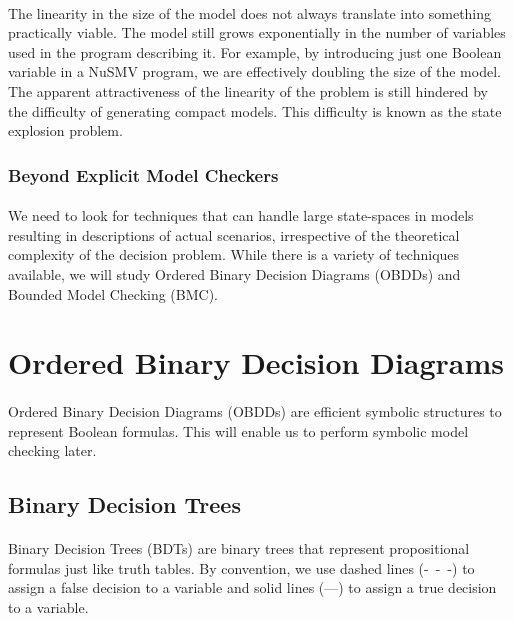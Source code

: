 \documentclass{article}
\theoremstyle{plain}
\theoremstyle{definition}
\begin{document}
\begin{multicols}{2}
\paragraph{} The linearity in the size of the model does not always translate into something practically viable. The model still grows exponentially in the number of variables used in the program describing it. For example, by introducing just one Boolean variable in a NuSMV program, we are effectively doubling the size of the model. The apparent attractiveness of the linearity of the problem is still hindered by the difficulty of generating compact models. This difficulty is known as the state explosion problem.

\subsubsection{Beyond Explicit Model Checkers}

\paragraph{} We need to look for techniques that can handle large state-spaces in models resulting in descriptions of actual scenarios, irrespective of the theoretical complexity of the decision problem. While there is a variety of techniques available, we will study Ordered Binary Decision Diagrams (OBDDs) and Bounded Model Checking (BMC). 

\section{Ordered Binary Decision Diagrams}

\paragraph{} Ordered Binary Decision Diagrams (OBDDs) are efficient symbolic structures to represent Boolean formulas. This will enable us to perform symbolic model checking later.

\subsection{Binary Decision Trees}

\paragraph{} Binary Decision Trees (BDTs) are binary trees that represent propositional formulas just like truth tables. By convention, we use dashed lines (-\ -\ -) to assign a false decision to a variable and solid lines (---) to assign a true decision to a variable.


\end{multicols}
\end{document}
